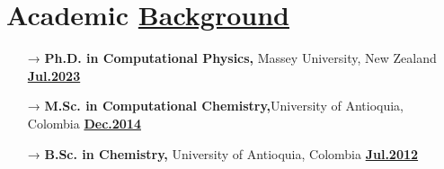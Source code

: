 \section{Academic \href{.}{Background}}

\begin{itemize}[leftmargin=5mm]
    \itemsep-6mm
    \item[→] {\bf Ph.D. in Computational Physics,} Massey University, New Zealand\hfill
        \href{.}{\bf Jul.2023}\\
    \item[→] {\bf M.Sc. in Computational Chemistry,}University of Antioquia, Colombia\hfill
        \href{.}{\bf Dec.2014}\\
    \item[→] {\bf B.Sc. in Chemistry,} University of Antioquia, Colombia\hfill
        \href{.}{\bf Jul.2012}\\
\end{itemize}
